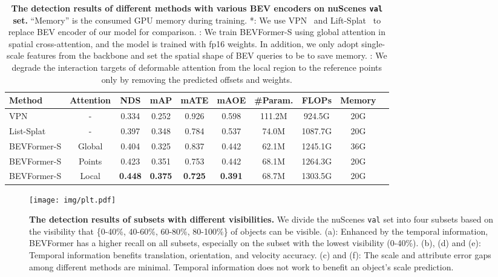 \documentclass{article}
\begin{document}
\begin{table}[t] 
\begin{center}
\caption{\textbf{The detection results of different methods with various BEV encoders on nuScenes \texttt{val} set.} ``Memory'' is the consumed GPU memory during training.
*: We use VPN~\cite{pan2020cross} and Lift-Splat~\cite{philion2020lift} to replace BEV encoder of our model for comparison. : We train BEVFormer-S using global attention in spatial cross-attention, and the model is trained with fp16 weights. In addition, we only adopt single-scale features from the backbone and set the spatial shape of BEV queries to be  to save memory.
: We degrade the interaction targets of deformable attention from the local region to the reference points only by removing the predicted offsets and weights.
}

\setlength{\tabcolsep}{1.4mm}
\begin{tabular}{l  c |c c c c |c c c  c }
\toprule
Method &  Attention & NDS  & mAP  & mATE    & mAOE       & \#Param. &FLOPs& Memory \\
\midrule


VPN~\cite{pan2020cross}&- & 0.334 &0.252 &0.926 &0.598 & 111.2M &924.5G &20G\\
List-Splat~\cite{philion2020lift}&- &  0.397 & 0.348 &0.784 &0.537 &74.0M & 1087.7G&20G \\

\midrule
\rowcolor{gray95}
BEVFormer-S &Global & 0.404 & 0.325 & 0.837 &0.442&62.1M & 1245.1G& 36G\\ \rowcolor{gray9}
BEVFormer-S& Points &0.423 &0.351 &0.753&0.442  & 68.1M & 1264.3G&20G\\
\rowcolor{gray85}
BEVFormer-S& Local &\textbf{0.448} &\textbf{0.375}&\textbf{0.725} &\textbf{0.391} & 68.7M &1303.5G &20G\\
\bottomrule
\end{tabular} \label{bevformer_s_abl}
\end{center}


\end{table}

\begin{figure}[t]
\centering
\texttt{[image: img/plt.pdf]}
\caption{\textbf{The detection results of subsets with different visibilities.} We divide the nuScenes \texttt{val} set into four subsets based on the visibility that \{0-40\%, 40-60\%, 60-80\%, 80-100\%\} of objects can be visible. (a): Enhanced by the temporal information, BEVFormer has a higher recall on all subsets, especially on the subset with the lowest visibility (0-40\%). (b), (d) and (e): Temporal information benefits translation, orientation, and velocity accuracy. (c) and (f): The scale and attribute error gaps among different methods are minimal. Temporal information does not work to benefit an object's scale prediction.}
\label{fig:plt}

\end{figure}
\end{document}
